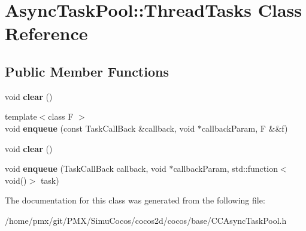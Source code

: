 \hypertarget{classAsyncTaskPool_1_1ThreadTasks}{}\section{Async\+Task\+Pool\+:\+:Thread\+Tasks Class Reference}
\label{classAsyncTaskPool_1_1ThreadTasks}
\subsection*{Public Member Functions}
\begin{DoxyCompactItemize}
\item 
\mbox{\label{classAsyncTaskPool_1_1ThreadTasks_a947589303ead15958058fc872f1844ed}} 
void {\bfseries clear} ()
\item 
\mbox{\label{classAsyncTaskPool_1_1ThreadTasks_a8ef05729835b988aceed383ff1d8814b}} 
{\footnotesize template$<$class F $>$ }\\void {\bfseries enqueue} (const Task\+Call\+Back \&callback, void $\ast$callback\+Param, F \&\&f)
\item 
\mbox{\label{classAsyncTaskPool_1_1ThreadTasks_a947589303ead15958058fc872f1844ed}} 
void {\bfseries clear} ()
\item 
\mbox{\label{classAsyncTaskPool_1_1ThreadTasks_a2c0da1c198fef044a06ce61c811a2a0b}} 
void {\bfseries enqueue} (Task\+Call\+Back callback, void $\ast$callback\+Param, std\+::function$<$ void()$>$ task)
\end{DoxyCompactItemize}


The documentation for this class was generated from the following file\+:\begin{DoxyCompactItemize}
\item 
/home/pmx/git/\+P\+M\+X/\+Simu\+Cocos/cocos2d/cocos/base/C\+C\+Async\+Task\+Pool.\+h\end{DoxyCompactItemize}
